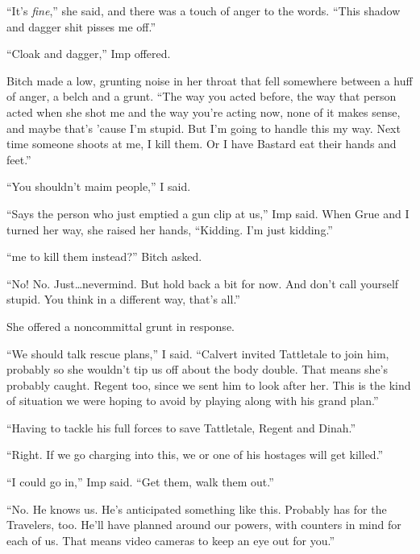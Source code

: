 ``It's \emph{fine},'' she said, and there was a touch of anger to the words.  ``This shadow and dagger shit pisses me off.''



``Cloak and dagger,'' Imp offered.



Bitch made a low, grunting noise in her throat that fell somewhere between a huff of anger, a belch and a grunt.  ``The way you acted before, the way that person acted when she shot me and the way you're acting now, none of it makes sense, and maybe that's 'cause I'm stupid.  But I'm going to handle this my way.  Next time someone shoots at me, I kill them.  Or I have Bastard eat their hands and feet.''



``You shouldn't maim people,'' I said.



``Says the person who just emptied a gun clip at us,'' Imp said.  When Grue and I turned her way, she raised her hands, ``Kidding.  I'm just kidding.''



``\ldotsWant me to kill them instead?''  Bitch asked.



``No!  No.  Just\ldots nevermind.  But hold back a bit for now.  And don't call yourself stupid.  You think in a different way, that's all.''



She offered a noncommittal grunt in response.



``We should talk rescue plans,'' I said.  ``Calvert invited Tattletale to join him, probably so she wouldn't tip us off about the body double.  That means she's probably caught.  Regent too, since we sent him to look after her.  This is the kind of situation we were hoping to avoid by playing along with his grand plan.''



``Having to tackle his full forces to save Tattletale, Regent and Dinah.''



``Right.  If we go charging into this, we or one of his hostages will get killed.''



``I could go in,'' Imp said.  ``Get them, walk them out.''



``No.  He knows us.  He's anticipated something like this.  Probably has for the Travelers, too.  He'll have planned around our powers, with counters in mind for each of us.  That means video cameras to keep an eye out for you.''



